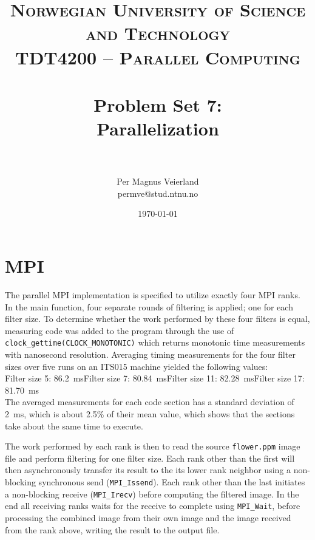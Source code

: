 

\title{
\normalfont \normalsize
\textsc{Norwegian University of Science and Technology\\TDT4200 -- Parallel Computing} \\ [25pt]
\horrule{0.5pt} \\[0.4cm]
\huge Problem Set 7:\\ Parallelization\\
\horrule{2pt} \\[0.5cm]
}

\author{Per Magnus Veierland\\permve@stud.ntnu.no}


\date{\normalsize\today}



\maketitle

\section*{MPI}

The parallel MPI implementation is specified to utilize exactly four MPI ranks. In the main function, four separate rounds of filtering is applied; one for each filter size. To determine whether the work performed by these four filters is equal, measuring code was added to the program through the use of \texttt{clock\_gettime(CLOCK\_MONOTONIC)} which returns monotonic time measurements with nanosecond resolution. Averaging timing measurements for the four filter sizes over five runs on an \textsc{ITS015} machine yielded the following values:\\[0.2cm]
Filter size 5: 86.2~ms\quad Filter size 7: 80.84~ms\quad Filter size 11: 82.28~ms\quad Filter size 17: 81.70~ms\\[0.2cm]
The averaged measurements for each code section has a standard deviation of 2~ms, which is about 2.5\% of their mean value, which shows that the sections take about the same time to execute.

The work performed by each rank is then to read the source \texttt{flower.ppm} image file and perform filtering for one filter size. Each rank other than the first will then asynchronously transfer its result to the its lower rank neighbor using a non-blocking synchronous send (\texttt{MPI\_Issend}). Each rank other than the last initiates a non-blocking receive (\texttt{MPI\_Irecv}) before computing the filtered image. In the end all receiving ranks waits for the receive to complete using \texttt{MPI\_Wait}, before processing the combined image from their own image and the image received from the rank above, writing the result to the output file.



